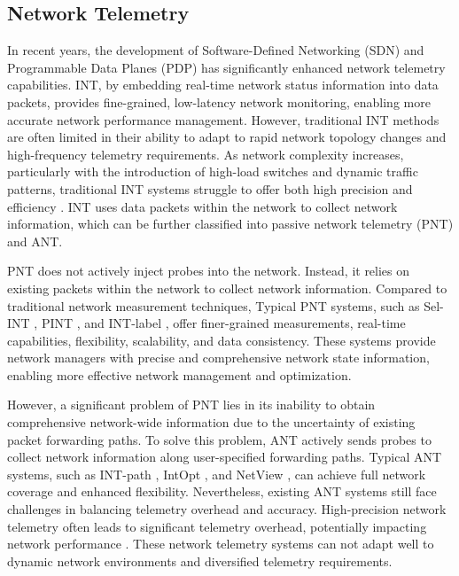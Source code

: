 \documentclass[journal]{IEEEtran}
\begin{document}
\subsection{Network Telemetry}
In recent years, the development of Software-Defined Networking (SDN) and Programmable Data Planes (PDP) has significantly enhanced network telemetry capabilities. INT, by embedding real-time network status information into data packets, provides fine-grained, low-latency network monitoring, enabling more accurate network performance management. However, traditional INT methods are often limited in their ability to adapt to rapid network topology changes and high-frequency telemetry requirements. As network complexity increases, particularly with the introduction of high-load switches and dynamic traffic patterns, traditional INT systems struggle to offer both high precision and efficiency \cite{5}. INT uses data packets within the network to collect network information, which can be further classified into passive network telemetry (PNT) and ANT.

PNT does not actively inject probes into the network. Instead, it relies on existing packets within the network to collect network information. Compared to traditional network measurement techniques, 
Typical PNT systems, such as Sel-INT \cite{33}, PINT \cite{10}, and INT-label \cite{11}, offer finer-grained measurements, real-time capabilities, flexibility, scalability, and data consistency. These systems provide network managers with precise and comprehensive network state information, enabling more effective network management and optimization.

However, a significant problem of PNT lies in its inability to obtain comprehensive network-wide information due to the uncertainty of existing packet forwarding paths. To solve this problem, ANT actively sends probes to collect network information along user-specified forwarding paths. Typical ANT systems, such as INT-path \cite{12}, IntOpt \cite{8}, and NetView \cite{13}, can achieve full network coverage and enhanced flexibility. 
Nevertheless, existing ANT systems still face challenges in balancing telemetry overhead and accuracy. High-precision network telemetry often leads to significant telemetry overhead, potentially impacting network performance \cite{9}. 
These network telemetry systems can not adapt well to dynamic network environments and diversified telemetry requirements.
\end{document}
